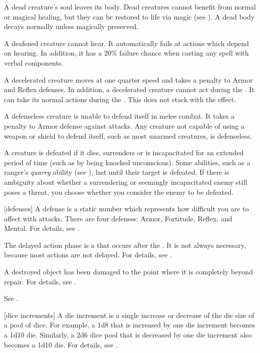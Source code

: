  A dead creature's soul leaves its body. Dead creatures cannot benefit from normal or magical healing, but they can be restored to life via magic (see ). A dead body decays normally unless magically preserved.

 A deafened creature cannot hear. It automatically fails at actions which depend on hearing. In addition, it has a 20\% failure chance when casting any spell with verbal components.

 A decelerated creature moves at one quarter speed and takes a  penalty to Armor and Reflex defenses.
In addition, a decelerated creature cannot act during the .
It can take its normal actions during the .
This does not stack with the  effect.

 A defenseless creature is unable to defend itself in melee combat.
It takes a  penalty to Armor defense against  attacks.
Any creature not capable of using a weapon or shield to defend itself, such as most unarmed creatures, is defenseless.

 A creature is defeated if it dies, surrenders or is incapacitated for an extended period of time (such as by being knocked unconscious).
Some abilities, such as a ranger's \textit{quarry} ability (see ), last until their target is defeated.
If there is ambiguity about whether a surrendering or seemingly incapacitated enemy still poses a threat, you choose whether you consider the enemy to be defeated.

[defenses] A defense is a static number which represents how difficult you are to affect with attacks.
There are four defenses: Armor, Fortitude, Reflex, and Mental.
For details, see .

 The delayed action phase is a  that occurs after the .
It is not always necessary, because most actions are not delayed.
For details, see .

 A destroyed object has been damaged to the point where it is completely beyond repair.
For details, see .

 See .

[dice increments] A die increment is a single increase or decrease of the die size of a pool of dice.
For example, a 1d8 that is increased by one die increment becomes a 1d10 die.
Similarly, a 2d6 dice pool that is decreased by one die increment also becomes a 1d10 die.
For details, see .

